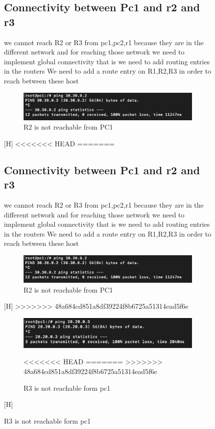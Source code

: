 \begin{figure}[H]
\subsection{Connectivity between Pc1 and r2 and r3}
we cannot reach R2 or R3 from pc1,pc2,r1 because they are in the different network and for reaching those network we need to implement global connectivity that is we need to add routing entries in the routers
\newline We need to add a route entry on R1,R2,R3 in order to reach between these host 
\begin{figure}[H]
\centering
  \includegraphics[width=400pt]{Images/connectivity between pc1 and r2.png}
  \caption{R2 is not reachable from PC1 }
  \label{fig:2.27}
\end{figure} [H]
<<<<<<< HEAD
=======
\subsection{Connectivity between Pc1 and r2 and r3}
we cannot reach R2 or R3 from pc1,pc2,r1 because they are in the different network and for reaching those network we need to implement global connectivity that is we need to add routing entries in the routers
\newline We need to add a route entry on R1,R2,R3 in order to reach between these host 
\begin{figure}[H]
\centering
  \includegraphics[width=400pt]{Images/connectivity between pc1 and r2.png}
  \caption{R2 is not reachable from PC1 }
  \label{fig:3.1}
\end{figure} [H]
>>>>>>> 48a684cd851a8df39224f8b6725a51314ead5f6e
\begin{figure}[H]
\centering
  \includegraphics[width=400pt]{Images/connectivity between pc1 and r3.png}
  \caption{R3 is not reachable form pc1}
<<<<<<< HEAD
  \label{fig:2.28}
=======
  \label{fig:3.1}
>>>>>>> 48a684cd851a8df39224f8b6725a51314ead5f6e
\end{figure} [H]

\end{figure}
